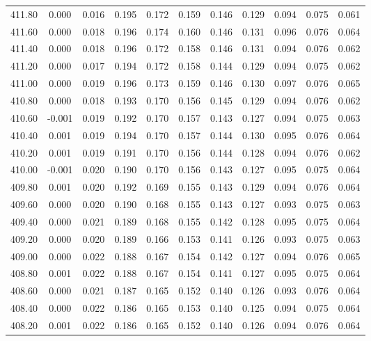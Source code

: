 \begin{longtable}{cccccccccc}
    411.80 &  0.000 &  0.016 &  0.195 &  0.172 &  0.159 &  0.146 &  0.129 &  0.094 &  0.075 &  0.061 \\
    411.60 &  0.000 &  0.018 &  0.196 &  0.174 &  0.160 &  0.146 &  0.131 &  0.096 &  0.076 &  0.064 \\
    411.40 &  0.000 &  0.018 &  0.196 &  0.172 &  0.158 &  0.146 &  0.131 &  0.094 &  0.076 &  0.062 \\
    411.20 &  0.000 &  0.017 &  0.194 &  0.172 &  0.158 &  0.144 &  0.129 &  0.094 &  0.075 &  0.062 \\
    411.00 &  0.000 &  0.019 &  0.196 &  0.173 &  0.159 &  0.146 &  0.130 &  0.097 &  0.076 &  0.065 \\
    410.80 &  0.000 &  0.018 &  0.193 &  0.170 &  0.156 &  0.145 &  0.129 &  0.094 &  0.076 &  0.062 \\
    410.60 & -0.001 &  0.019 &  0.192 &  0.170 &  0.157 &  0.143 &  0.127 &  0.094 &  0.075 &  0.063 \\
    410.40 &  0.001 &  0.019 &  0.194 &  0.170 &  0.157 &  0.144 &  0.130 &  0.095 &  0.076 &  0.064 \\
    410.20 &  0.001 &  0.019 &  0.191 &  0.170 &  0.156 &  0.144 &  0.128 &  0.094 &  0.076 &  0.062 \\
    410.00 & -0.001 &  0.020 &  0.190 &  0.170 &  0.156 &  0.143 &  0.127 &  0.095 &  0.075 &  0.064 \\
    409.80 &  0.001 &  0.020 &  0.192 &  0.169 &  0.155 &  0.143 &  0.129 &  0.094 &  0.076 &  0.064 \\
    409.60 &  0.000 &  0.020 &  0.190 &  0.168 &  0.155 &  0.143 &  0.127 &  0.093 &  0.075 &  0.063 \\
    409.40 &  0.000 &  0.021 &  0.189 &  0.168 &  0.155 &  0.142 &  0.128 &  0.095 &  0.075 &  0.064 \\
    409.20 &  0.000 &  0.020 &  0.189 &  0.166 &  0.153 &  0.141 &  0.126 &  0.093 &  0.075 &  0.063 \\
    409.00 &  0.000 &  0.022 &  0.188 &  0.167 &  0.154 &  0.142 &  0.127 &  0.094 &  0.076 &  0.065 \\
    408.80 &  0.001 &  0.022 &  0.188 &  0.167 &  0.154 &  0.141 &  0.127 &  0.095 &  0.075 &  0.064 \\
    408.60 &  0.000 &  0.021 &  0.187 &  0.165 &  0.152 &  0.140 &  0.126 &  0.093 &  0.076 &  0.064 \\
    408.40 &  0.000 &  0.022 &  0.186 &  0.165 &  0.153 &  0.140 &  0.125 &  0.094 &  0.075 &  0.064 \\
    408.20 &  0.001 &  0.022 &  0.186 &  0.165 &  0.152 &  0.140 &  0.126 &  0.094 &  0.076 &  0.064 \\

\end{longtable}
